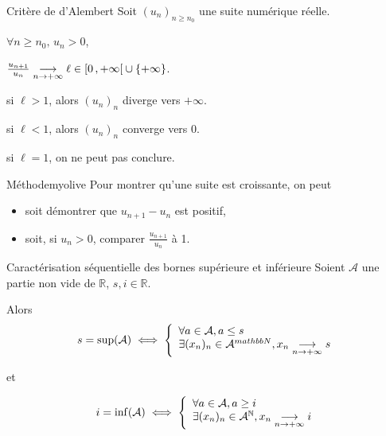     \begin{prop}{Critère de d’Alembert}{}
        Soit $(u_n)_{n \geq n_0}$ une suite numérique réelle.

        \begin{suppose}
            \item $\forall n \geq n_0, \, u_n > 0$,
            \item $\frac{u_{n+1}}{u_n} \underset{n \rightarrow +\infty}{\longrightarrow} \ell \in \left[ 0 \, , +\infty \right[ \cup \left\{ +\infty \right\}$.
        \end{suppose}
        \begin{alors}
            \item si $\ell > 1$, alors $(u_n)_n$ diverge vers $+\infty$.
            \item si $\ell < 1$, alors $(u_n)_n$ converge vers 0.
            \item si $\ell = 1$, on ne peut pas conclure.
        \end{alors}
    \end{prop}

    \begin{omed}{Méthode}{myolive}
        Pour montrer qu’une suite est croissante, on peut
        \begin{itemize}
            \item soit démontrer que $u_{n+1} - u_n$ est positif,
            \item soit, si $u_n > 0$, comparer $\frac{u_{n+1}}{u_n}$ à 1.
        \end{itemize}
    \end{omed}

    \begin{prop}{Caractérisation séquentielle des bornes supérieure et inférieure}{}
        Soient $\mathcal{A}$ une partie non vide de $\mathbb{R}$, $s,i \in \mathbb{R}$.

        Alors
        \[ s = \sup(\mathcal{A}) \iff \et{\forall a \in \mathcal{A},  a \leq s}{\exists (x_n)_n \in \mathcal{A}^{mathbb{N}}, x_n \limi{n}{+\infty} s} \]
       
        et 

        \[ i = \inf(\mathcal{A}) \iff \et{\forall a \in \mathcal{A},  a \geq i}{\exists (x_n)_n \in \mathcal{A}^{\mathbb{N}}, x_n \limi{n}{+\infty} i} \]
    \end{prop}

